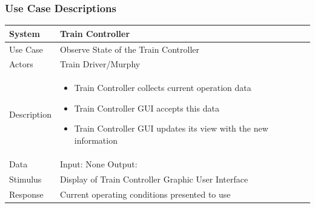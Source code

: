 \documentclass{article}
\begin{document}
    \subsubsection{Use Case Descriptions}
    \begin{longtable}{
    || >{\raggedright\arraybackslash}m{}
    | >{\raggedright\arraybackslash}m{}||}
    \hline
    \textbf{System} & \textbf{Train Controller} \\
    \hline
    Use Case & Observe State of the Train Controller\\
    \hline
    Actors & Train Driver/Murphy\\
    \hline
    Description & \begin{itemize}
        \item Train Controller collects current operation data
        \item Train Controller GUI accepts this data
        \item Train Controller GUI updates its view with the new information
    \end{itemize}\\
    \hline
    Data & Input: None \newline Output: \\
    \hline
    Stimulus & Display of Train Controller Graphic User Interface\\
    \hline
    Response & Current operating conditions presented to use\\
    \hline
    \end{longtable}
    
\end{document}
